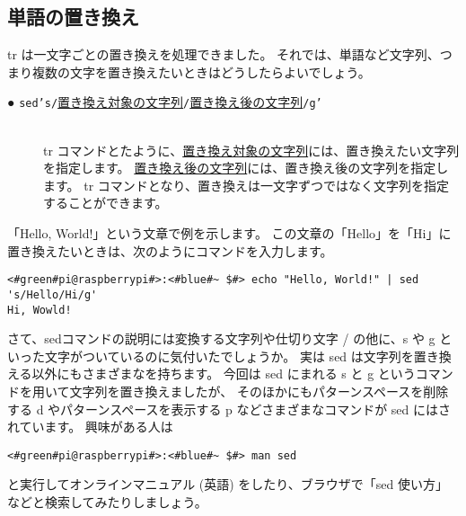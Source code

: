 \subsection{単語の置き換え}
tr は一文字ごとの置き換えを処理できました。
それでは、単語など文字列、つまり複数の文字を置き換えたいときはどうしたらよいでしょう。

\begin{description}
    \item[● \texttt{sed}\textvisiblespace\texttt{'s/}\underline{置き換え対象の文字列}\texttt{/}\underline{置き換え後の文字列}\texttt{/g'}]\mbox{}\\
    tr コマンドとたように、\underline{置き換え対象の文字列}には、置き換えたい文字列を指定します。
    \underline{置き換え後の文字列}には、置き換え後の文字列を指定します。
    tr コマンドとなり、置き換えは一文字ずつではなく文字列を指定することができます。
\end{description}

「Hello, World!」という文章で例を示します。
この文章の「Hello」を「Hi」に置き換えたいときは、次のようにコマンドを入力します。
\begin{lstlisting}[caption=sed コマンドを使った例, label=sed_app]
<#green#pi@raspberrypi#>:<#blue#~ $#> echo "Hello, World!" | sed 's/Hello/Hi/g'
Hi, Wowld!
\end{lstlisting}

さて、sedコマンドの説明には変換する文字列や仕切り文字 / の他に、s や g といった文字がついているのに気付いたでしょうか。
実は sed は文字列を置き換える以外にもさまざまなを持ちます。
今回は sed にまれる s と g というコマンドを用いて文字列を置き換えましたが、
そのほかにもパターンスペースを削除する d やパターンスペースを表示する p などさまざまなコマンドが sed にはされています。
興味がある人は
\begin{lstlisting}
<#green#pi@raspberrypi#>:<#blue#~ $#> man sed
\end{lstlisting}
と実行してオンラインマニュアル (英語) をしたり、ブラウザで「sed 使い方」などと検索してみたりしましょう。

\begin{tcolorbox}[title=\useOmetoi]
    \begin{enumerate}
\end{enumerate}
\end{tcolorbox}


